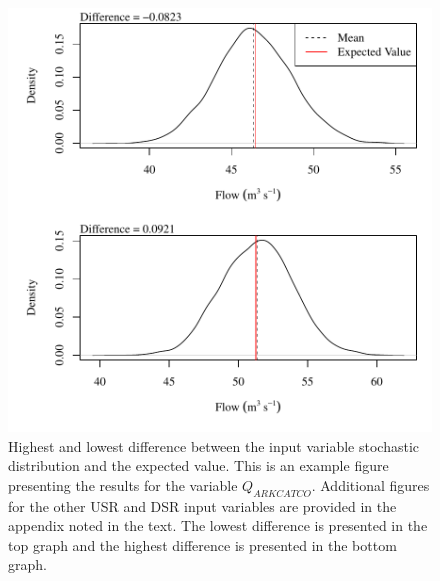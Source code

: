 \begin{linenumbers}
\begin{figure}[htbp]
\centering
	\includegraphics[width=6in]{"Figures/Results_USR/V min-max diff qin"}
	\caption[Highest and lowest difference between the input variable stochastic distribution and the expected value.]{Highest and lowest difference between the input variable stochastic distribution and the expected value.  This is an example figure presenting the results for the variable $Q_{ARKCATCO}$.  Additional figures for the other USR and DSR input variables are provided in the appendix noted in the text.  The lowest difference is presented in the top graph and the highest difference is presented in the bottom graph.}
	\label{fig:ExampleMinMaxDiff}
\end{figure}


\end{linenumbers}

